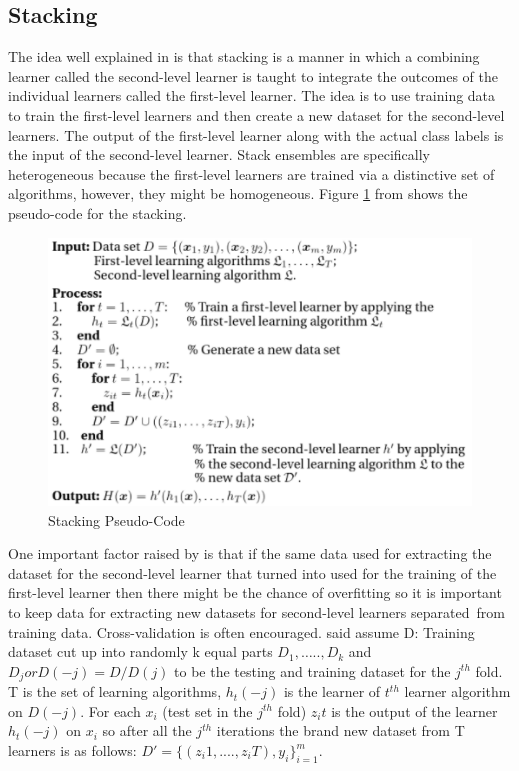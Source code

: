 \documentclass[12pt]{article}
\begin{document}
\subsection{Stacking}
The idea well explained in \citep{zhou2012ensemble} is that stacking is a manner in which a combining learner called the second-level learner is taught to integrate the outcomes of the individual learners called the first-level learner. The idea is to use training data to train the first-level learners and then create a new dataset for the second-level learners. The output of the first-level learner along with the actual class labels is the input of the second-level learner. Stack ensembles are specifically heterogeneous because the first-level learners are trained via a distinctive set of algorithms, however, they might be homogeneous. Figure \ref{fig:stacking} from \citep{zhou2012ensemble} shows the pseudo-code for the stacking. 
 \begin{figure}[h!]
 	\centering
	\includegraphics{stacking.png}
	\caption{Stacking Pseudo-Code ~\citep{zhou2012ensemble}}
	\label{fig:stacking}
\end{figure}
One important factor raised by \citep{zhou2012ensemble} is that if the same data used for extracting the dataset for the second-level learner that turned into used for the training of the first-level learner then there might be the chance of overfitting so it is important to keep data for extracting new datasets for second-level learners separated from training data. Cross-validation is often encouraged. \citep{zhou2012ensemble} said assume D: Training dataset cut up into randomly k equal parts $D_1,….., D_k$ and $D_j or D(-j) = D / D(j)$ to be the testing and training dataset for the $j^{th}$ fold. T is the set of learning algorithms, $h_t(-j)$ is the learner of $t^{th}$ learner algorithm on $D(-j)$. For each $x_i$ (test set in the $j^{th}$ fold) $z_it$ is the output of the learner $h_t(-j)$ on $x_i$ so after all the $j^{th}$ iterations the brand new dataset from T learners is as follows: $D' = \{(z_i1,....,z_iT), y_i\}^{m}_{i=1}$.
\end{document}
